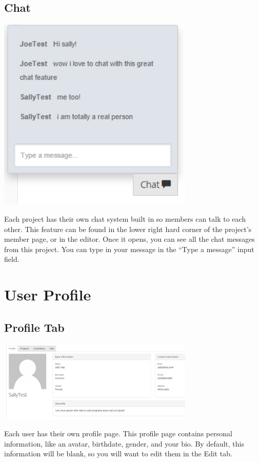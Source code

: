 \documentclass[11pt]{report}
\begin{document}
\section{Chat}
	\begin{center}
           \includegraphics[width=0.7\textwidth]{chat.png}
    \end{center}
Each project has their own chat system built in so members can talk to each other. This feature can be found in the lower right hard corner of the project’s member page, or in the editor. Once it opens, you can see all the chat messages from this project. You can type in your message in the “Type a message” input field. 


\chapter{User Profile}

\section{Profile Tab}   
	\begin{center}
           \includegraphics[width=0.7\textwidth]{profile.png}
    \end{center}
Each user has their own profile page. This profile page contains personal information, like an avatar, birthdate, gender, and your bio. By default, this information will be blank, so you will want to edit them in the Edit tab.
\end{document}
